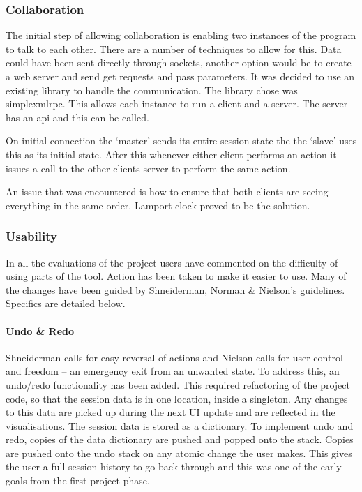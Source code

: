 \subsubsection{Collaboration}

The initial step of allowing collaboration is enabling two instances of the program to talk to each other.  There are a number of techniques to allow for this.  Data could have been sent directly through sockets, another option would be to create a web server and send get requests and pass parameters.  It was decided to use an existing library to handle the communication.  The library chose was simplexmlrpc.  This allows each instance to run a client and a server.  The server has an api and this can be called.

On initial connection the `master' sends its entire session state the the `slave' uses this as its initial state.  After this whenever either client performs an action it issues a call to the other clients server to perform the same action.

An issue that was encountered is how to ensure that both clients are seeing everything in the same order.  Lamport clock proved to be the solution.

\subsubsection{Usability}

In all the evaluations of the project users have commented on the difficulty of using parts of the tool.  Action has been taken to make it easier to use.  Many of the changes have been guided by Shneiderman, Norman \& Nielson's guidelines.  Specifics are detailed below.

\paragraph{Undo \& Redo}
Shneiderman calls for easy reversal of actions and Nielson calls for user control and freedom -- an emergency exit from an unwanted state.  To address this, an undo/redo functionality has been added.  This required refactoring of the project code, so that the session data is in one location, inside a singleton. Any changes to this data are picked up during the next \ac{UI} update and are reflected in the visualisations.  The session data is stored as a dictionary.  To implement undo and redo, copies of the data dictionary are pushed and popped onto the stack.  Copies are pushed onto the undo stack on any atomic change the user makes.  This gives the user a full session history to go back through and this was one of the early goals from the first project phase.

